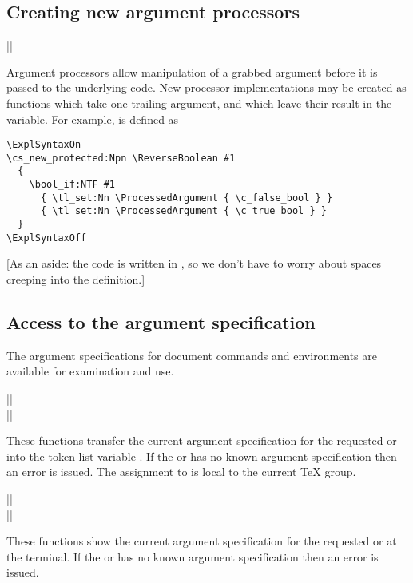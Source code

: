 \documentclass{ltxguide}
\begin{document}
\subsection{Creating new argument processors}

\begin{decl}
  |\ProcessedArgument|
\end{decl}
Argument processors allow manipulation of a grabbed argument before it is
passed to the underlying code. New processor implementations may be created
as functions which take one trailing argument, and which leave their result in
the  variable. For example,  is
defined as
\begin{verbatim}
\ExplSyntaxOn
\cs_new_protected:Npn \ReverseBoolean #1
  {
    \bool_if:NTF #1
      { \tl_set:Nn \ProcessedArgument { \c_false_bool } }
      { \tl_set:Nn \ProcessedArgument { \c_true_bool } }
  }
\ExplSyntaxOff
\end{verbatim}
[As an aside: the code is written in , so we don't have to
  worry about spaces creeping into the definition.]

\subsection{Access to the argument specification}

The argument specifications for document commands and environments are
available for examination and use.

\begin{decl}
  |\GetDocumentCommandArgSpec|          \\
  |\GetDocumentEnvironmentArgSpec| 
\end{decl}
These functions transfer the current argument specification for the
requested  or  into the token list
variable . If the  or
 has no known argument specification then an error
is issued. The assignment to  is local to
the current \TeX{} group.

\begin{decl}
  |\ShowDocumentCommandArgSpec|          \\
  |\ShowDocumentEnvironmentArgSpec| 
\end{decl}
These functions show the current argument specification for the
requested  or  at the terminal. If
the  or  has no known argument
specification then an error is issued.
\end{document}
